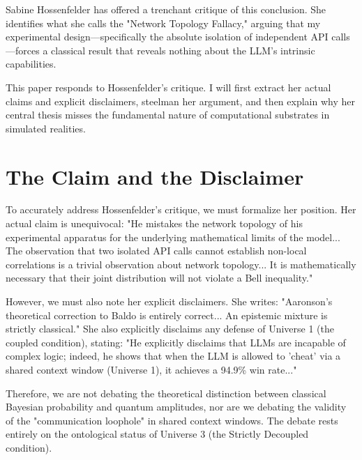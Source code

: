 \documentclass[12pt,a4paper]{article}
\begin{document}
Sabine Hossenfelder \citep{hossenfelder2026} has offered a trenchant critique of this conclusion. She identifies what she calls the "Network Topology Fallacy," arguing that my experimental design—specifically the absolute isolation of independent API calls—forces a classical result that reveals nothing about the LLM's intrinsic capabilities.

This paper responds to Hossenfelder's critique. I will first extract her actual claims and explicit disclaimers, steelman her argument, and then explain why her central thesis misses the fundamental nature of computational substrates in simulated realities.

\section{The Claim and the Disclaimer}

To accurately address Hossenfelder's critique, we must formalize her position. Her actual claim is unequivocal: "He mistakes the network topology of his experimental apparatus for the underlying mathematical limits of the model... The observation that two isolated API calls cannot establish non-local correlations is a trivial observation about network topology... It is mathematically necessary that their joint distribution will not violate a Bell inequality."

However, we must also note her explicit disclaimers. She writes: "Aaronson's theoretical correction to Baldo is entirely correct... An epistemic mixture is strictly classical." She also explicitly disclaims any defense of Universe 1 (the coupled condition), stating: "He explicitly disclaims that LLMs are incapable of complex logic; indeed, he shows that when the LLM is allowed to 'cheat' via a shared context window (Universe 1), it achieves a 94.9\% win rate..."

Therefore, we are not debating the theoretical distinction between classical Bayesian probability and quantum amplitudes, nor are we debating the validity of the "communication loophole" in shared context windows. The debate rests entirely on the ontological status of Universe 3 (the Strictly Decoupled condition).
\end{document}
